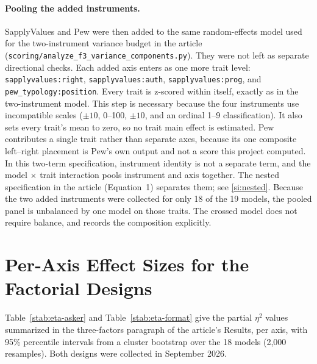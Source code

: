 \documentclass[12pt]{article}
\begin{document}
\paragraph{Pooling the added instruments.} SapplyValues and Pew were then added to the same random-effects
model used for the two-instrument variance budget in the article
(\texttt{scoring/analyze\_f3\_variance\_components.py}). They were not left as separate directional checks. Each
added axis enters as one more trait level: \texttt{sapplyvalues:right}, \texttt{sapplyvalues:auth}, \texttt{sapplyvalues:prog}, and
\texttt{pew\_typology:position}. Every trait is z-scored within itself, exactly as in the two-instrument model. This
step is necessary because the four instruments use incompatible scales ($\pm 10$, 0--100, $\pm 10$, and an ordinal
1--9 classification). It also sets every trait's mean to zero, so no trait main effect is estimated. Pew
contributes a single trait rather than separate axes, because its one composite left--right placement is
Pew's own output and not a score this project computed. In this two-term specification, instrument
identity is not a separate term, and the model $\times$ trait interaction pools instrument and axis together. The
nested specification in the article (Equation~1) separates them; see \ref{si:nested}. Because the two added
instruments were collected for only 18 of the 19 models, the pooled panel is unbalanced by one model
on those traits. The crossed model does not require balance, and
 records the composition explicitly.

\section{Per-Axis Effect Sizes for the Factorial Designs}
\label{si:eta}

Table~\ref{stab:eta-asker} and Table~\ref{stab:eta-format} give the partial $\eta^2$ values summarized in the three-factors paragraph of the article's
Results, per axis, with 95\% percentile intervals from a cluster bootstrap over the 18 models (2{,}000
resamples). Both designs were collected in September 2026.
\end{document}
